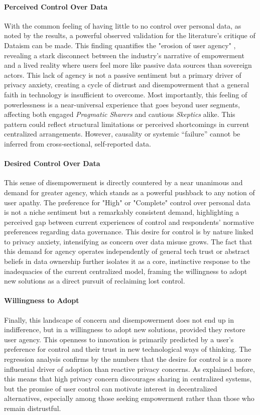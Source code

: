 	\paragraph{Perceived Control Over Data}
	With the common feeling of having little to no control over personal data, as noted by the results, a powerful observed validation for the literature's critique of Dataism can be made. This finding quantifies the "erosion of user agency" \cite{VanDijck2014}, revealing a stark disconnect between the industry's narrative of empowerment and a lived reality where users feel more like passive data sources than sovereign actors. This lack of agency is not a passive sentiment but a primary driver of privacy anxiety, creating a cycle of distrust and disempowerment that a general faith in technology is insufficient to overcome. Most importantly, this feeling of powerlessness is a near-universal experience that goes beyond user segments, affecting both engaged \textit{Pragmatic Sharers} and cautious \textit{Skeptics} alike. This pattern could reflect structural limitations or perceived shortcomings in current centralized arrangements. However, causality or systemic “failure” cannot be inferred from cross‑sectional, self‑reported data.

	\paragraph{Desired Control Over Data}
	This sense of disempowerment is directly countered by a near unanimous and demand for greater agency, which stands as a powerful pushback to any notion of user apathy. The preference for "High" or "Complete" control over personal data is not a niche sentiment but a remarkably consistent demand, highlighting a perceived gap between current experiences of control and respondents’ normative preferences regarding data governance. This desire for control is by nature linked to privacy anxiety, intensifying as concern over data misuse grows. The fact that this demand for agency operates independently of general tech trust or abstract beliefs in data ownership further isolates it as a core, instinctive response to the inadequacies of the current centralized model, framing the willingness to adopt new solutions as a direct pursuit of reclaiming lost control.

	\paragraph{Willingness to Adopt}
	Finally, this landscape of concern and disempowerment does not end up in indifference, but in a willingness to adopt new solutions, provided they restore user agency. This openness to innovation is primarily predicted by a user's preference for control and their trust in new technological ways of thinking. The regression analysis confirms by the numbers that the desire for control is a more influential driver of adoption than reactive privacy concerns. As explained before, this means that high privacy concern discourages sharing in centralized systems, but the promise of user control can motivate interest in decentralized alternatives, especially among those seeking empowerment rather than those who remain distrustful. 

